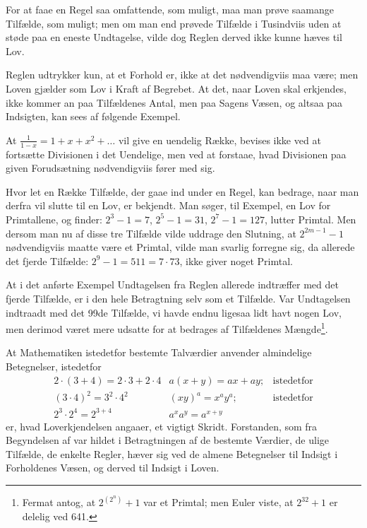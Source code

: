 \documentclass[12pt]{book}
\newcommand{\opage}[1]{\marginnote{\footnotesize\textit{[#1]}}}
\begin{document}
For at faae en Regel saa omfattende, som muligt, maa man prøve saamange
Tilfælde, som muligt; men om man end prøvede Tilfælde i Tusindviis uden at støde
paa en eneste Undtagelse, vilde dog Reglen derved ikke kunne hæves til Lov.

Reglen udtrykker kun, at et Forhold er, ikke at det nødvendigviis maa
være; men Loven gjælder som Lov i Kraft af Begrebet. At det, naar Loven skal
erkjendes, ikke kommer an paa Tilfældenes Antal, men paa Sagens Væsen, og
altsaa paa Indsigten, kan sees af følgende Exempel.

At $\frac{1}{1-x} = 1 + x + x^{2} + \ldots$ vil give en uendelig Række, bevises
ikke ved at fortsætte Divisionen i det Uendelige,
\opage{8} men ved at forstaae, hvad Divisionen paa given Forudsætning nødvendigviis fører
med sig.

Hvor let en Række Tilfælde, der gaae ind under en Regel, kan bedrage, naar man
derfra vil slutte til en Lov, er bekjendt. Man søger, til Exempel, en Lov for
Primtallene, og finder: $2^{3}-1 = 7$, $2^{5}-1 = 31$, $2^{7}-1 = 127$, lutter
Primtal. Men dersom man nu af disse tre Tilfælde vilde uddrage den Slutning, at
$2^{2m-1}-1$ nødvendigviis maatte være et Primtal, vilde man svarlig forregne
sig, da allerede det fjerde Tilfælde: $2^{9}-1 = 511 = 7\cdot 73$, ikke giver
noget Primtal.

At i det anførte Exempel Undtagelsen fra Reglen allerede indtræffer med det
fjerde Tilfælde, er i den hele Betragtning selv som et Tilfælde. Var Undtagelsen
indtraadt med det 99de Tilfælde, vi havde endnu ligesaa lidt havt nogen Lov, men
derimod været mere udsatte for at bedrages af Tilfældenes Mængde\footnote{Fermat
antog, at $2^{(2^{n})}+1$ var et Primtal; men Euler viste, at $2^{32}+1$ er
delelig ved 641.}.

At Mathematiken istedetfor bestemte Talværdier anvender almindelige Betegnelser,
istedetfor
\[
\begin{array}{lll}
2\cdot(3+4) = 2\cdot 3 + 2\cdot 4 & a(x+y) = ax + ay; & \text{istedetfor}\\[2pt]
(3\cdot 4)^{2} = 3^{2}\cdot 4^{2} & (xy)^{a} = x^{a}y^{a}; & \text{istedetfor}\\[2pt]
2^{3}\cdot 2^{4} = 2^{3+4} & a^{x}a^{y} = a^{x+y} &
\end{array}
\]
er, hvad Loverkjendelsen angaaer, et vigtigt Skridt. Forstanden, som fra
Begyndelsen af var hildet i Betragtningen af de bestemte Værdier, de ulige
Tilfælde, de enkelte Regler, hæver sig ved de almene Betegnelser til Indsigt i
Forholdenes Væsen, og derved til Indsigt i Loven.
\end{document}
